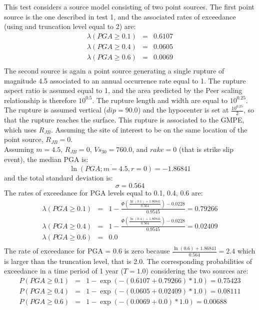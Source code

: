 This test considers a source model consisting of two point sources. The
first point source is the one described in test 1, and the associated rates of
exceedance (using \textcite{sadigh1997} and truncation level equal to 2)
are:
 \begin{eqnarray}
\lambda(PGA \geq 0.1) & = & 0.6107 \nonumber \\
\lambda(PGA \geq 0.4) & = & 0.0605 \nonumber \\
\lambda(PGA \geq 0.6) & = & 0.0069 \nonumber \\
\end{eqnarray}
The second source is again a point source generating a single rupture of
magnitude 4.5 associated to an annual occurrence rate equal to 1. The rupture
aspect ratio is assumed equal to 1, and the area predicted by the Peer scaling
relationship is therefore $10^{0.5}$. The rupture length and width are equal to
$10^{0.25}$. The rupture is assumed vertical ($dip = 90.0$) and the hypocenter
is set at $\frac{10^{0.25}}{2}$, so that the rupture reaches the surface.  This
rupture is associated to the \textcite{boore2008} GMPE, which uses $R_{JB}$.
Assuming the site of interest to be on the same location of the point source,
$R_{JB} = 0$.\\
Assuming $m = 4.5$, $R_{JB} = 0$, $Vs_{30} = 760.0$, and $rake = 0$ (that is strike slip event), the median PGA is:
\begin{equation}
\overline{\ln(PGA;m=4.5,r=0)} = - 1.86841
\end{equation}
and the total standard deviation is:
\begin{equation}
\sigma = 0.564
\end{equation}
The rates of exceedance for PGA levels equal to 0.1, 0.4, 0.6 are:
\begin{eqnarray}
\lambda(PGA \geq 0.1) & = & 1 - \frac{\Phi(\frac{\ln(0.1) + 1.86841} {0.564}) -0.0228}
					{0.9545} = 0.79266 \nonumber \\
\lambda(PGA \geq 0.4) & = & 1 - \frac{\Phi(\frac{\ln(0.4) + 1.86841} {0.564}) -0.0228}
					{0.9545} = 0.02409 \nonumber \\
\lambda(PGA \geq 0.6) & = & 0.0\nonumber \\
\end{eqnarray}
The rate of exceedance for PGA = 0.6 is zero because $\frac{\ln(0.6) + 1.86841} {0.564} = 2.4$ which is larger than the truncation level, that is 2.0. 
The corresponding probabilities of exceedance in a time period of 1 year ($T=1.0$) considering the two sources are:
\begin{eqnarray}
P(PGA \geq 0.1) & = & 1 - \exp(- (0.6107 + 0.79266) * 1.0) =  0.75423\nonumber \\
P(PGA \geq 0.4) & = & 1 - \exp(- (0.0605 + 0.02409) * 1.0) =  0.08111\nonumber \\
P(PGA \geq 0.6) & = & 1 - \exp(- (0.0069 + 0.0) * 1.0) = 0.00688 \nonumber \\
\end{eqnarray}
%
\clearpage
%
